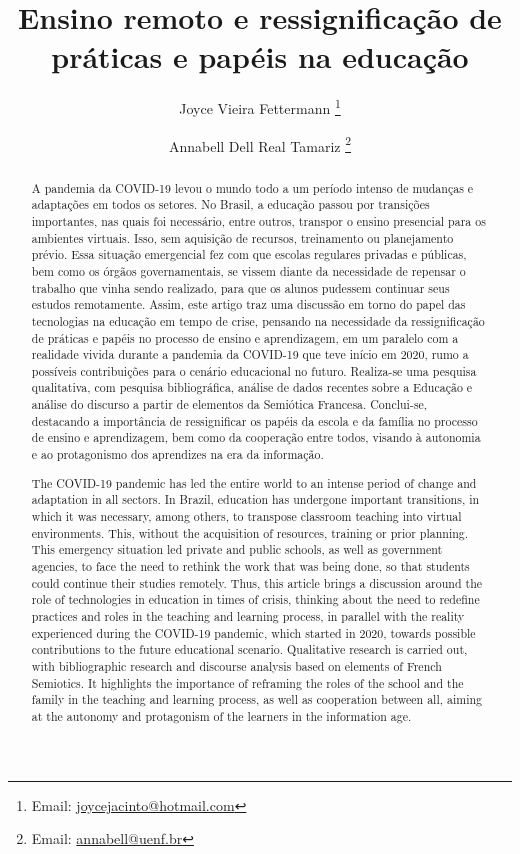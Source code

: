 \documentclass{textolivre}
\title{Ensino remoto e ressignificação de práticas e papéis na educação}
\author[1]{Joyce Vieira Fettermann \orcid{0000-0002-0479-6005} \thanks{Email: \url{joycejacinto@hotmail.com}}}
\author[1]{Annabell Dell Real Tamariz  \orcid{0000-0001-9951-0657} \thanks{Email: \url{annabell@uenf.br}}}
\affil[1]{Universidade Estadual do Norte Fluminense Darcy Ribeiro, Brasil.}
\begin{document}
\maketitle

\begin{polyabstract}
\begin{abstract}
A pandemia da COVID-19 levou o mundo todo a um período intenso de mudanças e adaptações em todos os setores. No Brasil, a educação passou por transições importantes, nas quais foi necessário, entre outros, transpor o ensino presencial para os ambientes virtuais. Isso, sem aquisição de recursos, treinamento ou planejamento prévio. Essa situação emergencial fez com que escolas regulares privadas e públicas, bem como os órgãos governamentais, se vissem diante da necessidade de repensar o trabalho que vinha sendo realizado, para que os alunos pudessem continuar seus estudos remotamente. Assim, este artigo traz uma discussão em torno do papel das tecnologias na educação em tempo de crise, pensando na necessidade da ressignificação de práticas e papéis no processo de ensino e aprendizagem, em um paralelo com a realidade vivida durante a pandemia da COVID-19 que teve início em 2020, rumo a possíveis contribuições para o cenário educacional no futuro. Realiza-se uma pesquisa qualitativa, com pesquisa bibliográfica, análise de dados recentes sobre a Educação e análise do discurso a partir de elementos da Semiótica Francesa. Conclui-se, destacando a importância de ressignificar os papéis da escola e da família no processo de ensino e aprendizagem, bem como da cooperação entre todos, visando à autonomia e ao protagonismo dos aprendizes na era da informação.

\end{abstract}

\begin{english}
\begin{abstract}
The COVID-19 pandemic has led the entire world to an intense period of change and adaptation in all sectors. In Brazil, education has undergone important transitions, in which it was necessary, among others, to transpose classroom teaching into virtual environments. This, without the acquisition of resources, training or prior planning. This emergency situation led private and public schools, as well as government agencies, to face the need to rethink the work that was being done, so that students could continue their studies remotely. Thus, this article brings a discussion around the role of technologies in education in times of crisis, thinking about the need to redefine practices and roles in the teaching and learning process, in parallel with the reality experienced during the COVID-19 pandemic, which started in 2020, towards possible contributions to the future educational scenario. Qualitative research is carried out, with bibliographic research and discourse analysis based on elements of French Semiotics. It highlights the importance of reframing the roles of the school and the family in the teaching and learning process, as well as cooperation between all, aiming at the autonomy and protagonism of the learners in the information age.


\end{abstract}
\end{english}
\end{polyabstract}
\end{document}
